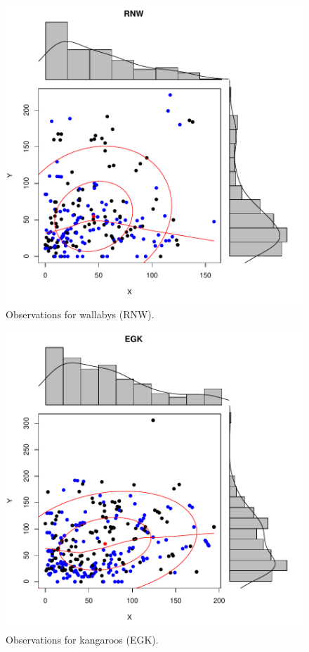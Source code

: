 \documentclass{article}
\begin{document}
\begin{figure}
\begin{center}
\includegraphics{WC86-fig2}
\end{center}
\caption{Observations for wallabys (RNW).}
\label{fig:two}
\end{figure}

\begin{figure}
\begin{center}
\includegraphics{WC86-fig3}
\end{center}
\caption{Observations for kangaroos (EGK).}
\label{fig:three}
\end{figure}
\end{document}
